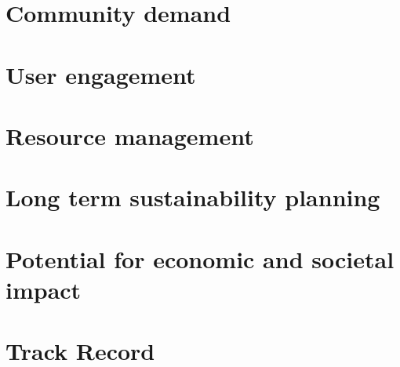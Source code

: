 \documentclass[a4paper,11point]{article}
\begin{document}
\section{Community demand}

\section{User engagement}

\section{Resource management}

\section{Long term sustainability planning}

\section{Potential for economic and societal impact}

\section{Track Record}



\end{document}

